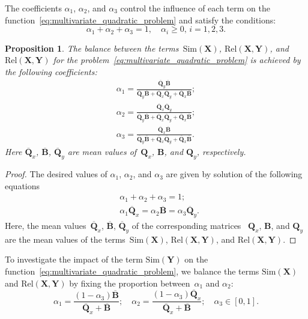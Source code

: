 \documentclass[12pt,oneside]{article}
\newtheorem{proposition}{Proposition}
\theoremstyle{definition}
\newcommand{\bY}{\mathbf{Y}}
\newcommand{\bX}{\mathbf{X}}
\newcommand{\bB}{\mathbf{B}}
\newcommand{\bQ}{\mathbf{Q}}
\begin{document}
The coefficients $\alpha_1$, $\alpha_2$, and $\alpha_3$ control the influence of each term on the function~\eqref{eq:multivariate_quadratic_problem} and satisfy the conditions:
\begin{equation}
\alpha_1 + \alpha_2 + \alpha_3 = 1, \quad \alpha_i \geq 0, \, i = 1, 2, 3.
\end{equation}
\begin{proposition}
	The balance between the terms~$\text{Sim}(\bX)$, $\text{Rel}(\bX, \bY)$, and $\text{Rel}(\bX, \bY)$ for the problem~\eqref{eq:multivariate_quadratic_problem} is achieved by the following coefficients:
	\begin{align}
	\alpha_1 = \frac{\overline{\bQ}_y \overline{\bB} }{\overline{\bQ}_y \overline{\bB} + \overline{\bQ}_x \overline{\bQ}_y + \overline{\bQ}_x \overline{\bB}}; \\
	\alpha_2 = \frac{\overline{\bQ}_x \overline{\bQ}_y}{\overline{\bQ}_y \overline{\bB} + \overline{\bQ}_x \overline{\bQ}_y + \overline{\bQ}_x \overline{\bB}}; \\
	\alpha_3  = \frac{\overline{\bQ}_x \overline{\bB}}{\overline{\bQ}_y \overline{\bB} + \overline{\bQ}_x \overline{\bQ}_y + \overline{\bQ}_x \overline{\bB}}.
	\label{eq:alpha_3}
	\end{align}
	Here $\overline{\bQ}_x$, $\overline{\bB}$, $\overline{\bQ}_y$ are mean values of~$\bQ_x$, $\bB$, and $\bQ_y$, respectively.

\end{proposition}
\begin{proof}
	The desired values of $\alpha_1$, $\alpha_2$, and $\alpha_3$ are given by solution of the following equations
	\begin{align}
		&\alpha_1 + \alpha_2 + \alpha_3 = 1; \\
		&\alpha_1 \overline{\bQ}_x = \alpha_2 \overline{\bB} = \alpha_3 \overline{\bQ}_y.
	\end{align}
	Here, the mean values~$\overline{\bQ}_x$, $\overline{\bB}$, $\overline{\bQ}_y$ of the corresponding matrices ~$\bQ_x$, $\bB$, and $\bQ_y$ are the mean values of the terms~$\text{Sim}(\bX)$, $\text{Rel}(\bX, \bY)$, and $\text{Rel}(\bX, \bY)$.
\end{proof}
To investigate the impact of the term $\text{Sim}(\bY)$ on the function~\eqref{eq:multivariate_quadratic_problem}, we balance the terms $\text{Sim}(\bX)$ and $\text{Rel}(\bX, \bY)$ by fixing the proportion between~$\alpha_1$ and $\alpha_2$:
\begin{equation}
\alpha_1 = \frac{(1 - \alpha_3)\overline{\bB}}{\overline{\bQ}_x + \overline{\bB}}; \quad
\alpha_2 = \frac{(1 - \alpha_3)\overline{\bQ}_x}{\overline{\bQ}_x + \overline{\bB}}; \quad
\alpha_3 \in [0, 1].
\label{eq:alphas3}
\end{equation}
\end{document}
